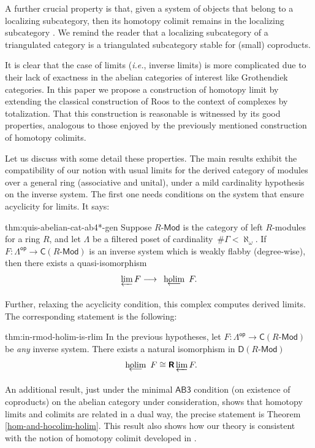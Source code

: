 \documentclass[reqno,11pt]{amsart}
\theoremstyle{plain}
\newtheorem{thm}{Theorem}[section]
\theoremstyle{remark}
\theoremstyle{definition}
\numberwithin{equation}{thm}
\newcommand{\CCC}{\boldsymbol{\mathsf{C}}}
\newcommand{\D}{\boldsymbol{\mathsf{D}}}
\newcommand{\R}{\boldsymbol{\mathsf{R}}}
\newcommand{\holim}[1]{\begin{array}[t]{c} {\rm holim}\\[-7.5 pt]
		{\longleftarrow} \end{array}}
\newcommand{\lto}{\longrightarrow}
\newcommand{\md}{\text{-}\mathsf{Mod}}
\newcommand{\op}{\mathsf{op}}
\begin{document}
A further crucial property is that, given a system of objects that belong to a localizing subcategory, then its homotopy colimit remains in the localizing subcategory \cite[Theorem 3.1]{AJS}. We remind the reader that a localizing subcategory of a triangulated category is a triangulated subcategory stable for (small) coproducts.

It is clear that the case of limits (\textit{i.e.}, inverse limits) is more complicated due to their lack of exactness in the abelian categories of interest like Grothendiek categories. In this paper we propose a construction of homotopy limit by extending the classical construction of Roos \cite{roos-1958} to the context of complexes by totalization. That this construction is reasonable is witnessed by its good properties, analogous to those enjoyed by the previously mentioned construction of homotopy colimits.

Let us discuss with some detail these properties. The main results exhibit the compatibility of our notion with usual limits for the derived category of modules over a general ring (associative and unital), under a mild cardinality hypothesis on the inverse system. The first one needs conditions on the system that ensure acyclicity for limits. It says: 

\begin{reptheorem}{thm:quis-abelian-cat-ab4*-gen}
	Suppose $R\md$ is the category of left $R$-modules for a ring $R$, and let $\Lambda$ be a filtered poset of cardinality \,$\#\Gamma < \aleph_\omega$. If $F \colon \Lambda^\op \to \CCC(R\md)$ is an inverse system which is weakly flabby (degree-wise), then there exists a quasi-isomorphism 
	\[ \varprojlim F \lto \holim{} F.\]
\end{reptheorem}

Further, relaxing the acyclicity condition, this complex computes derived limits. The corresponding statement is the following:

\begin{reptheorem}{thm:in-rmod-holim-is-rlim}
In the previous hypotheses, let $F \colon \Lambda^\op \to \CCC(R\md)$ be \emph{any} inverse system. There exists a natural isomorphism in $\D(R\md)$ 
\[
	\holim{} F \cong \R\varprojlim F.
\]
\end{reptheorem}

An additional result, just under the minimal $\mathsf{AB3}$ condition (on existence of coproducts) on the abelian category under consideration, shows that homotopy limits and colimits are related in a dual way, the precise statement is Theorem \ref{hom-and-hocolim-holim}. This result also shows how our theory is consistent with the notion of homotopy colimit developed in \cite{AJS}.
\end{document}
